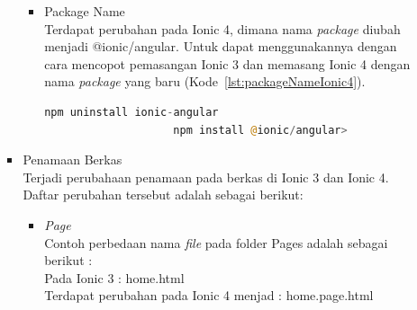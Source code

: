 \begin{enumerate}
\begin{enumerate}
\begin{itemize}
\begin{itemize}
				\item Package Name \\
				Terdapat perubahan pada Ionic 4, dimana nama {\it package} diubah menjadi @ionic/angular. Untuk dapat menggunakannya dengan cara mencopot pemasangan Ionic 3 dan memasang Ionic 4 dengan nama {\it package} yang baru (Kode~\ref{lst:packageNameIonic4}).
				\begin{lstlisting}[language=php, label={lst:packageNameIonic4}, caption=Penggunaan Button pada Ionic 4]
					npm uninstall ionic-angular
					npm install @ionic/angular>
				\end{lstlisting}
			\end{itemize}
	
			
	


	

			\item Penamaan Berkas \\
			Terjadi perubahaan penamaan pada berkas di Ionic 3 dan Ionic 4. Daftar perubahan tersebut adalah sebagai berikut:
			\begin{itemize}
				\item {\it Page} \\
				Contoh perbedaan nama {\it file} pada folder Pages adalah sebagai berikut :\\
				Pada Ionic 3 : home.html  \\
				Terdapat perubahan pada Ionic 4 menjad : home.page.html
	

\end{itemize}
\end{itemize}
\end{enumerate}
\end{enumerate}
